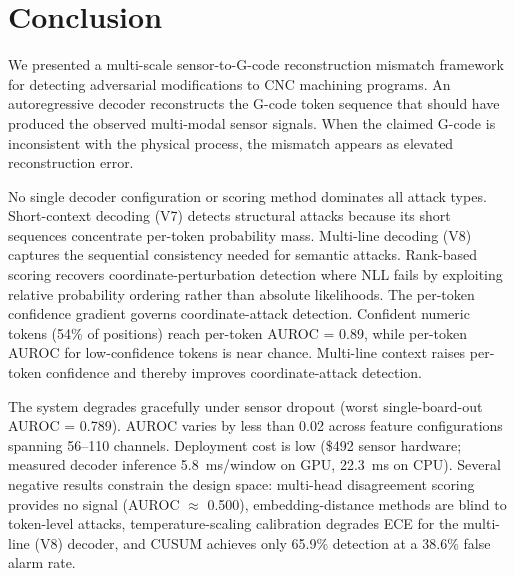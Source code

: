\section{Conclusion}
\label{sec:conclusion}

We presented a multi-scale sensor-to-G-code reconstruction mismatch framework for detecting adversarial modifications to CNC machining programs.
An autoregressive decoder reconstructs the G-code token sequence that should have produced the observed multi-modal sensor signals.
When the claimed G-code is inconsistent with the physical process, the mismatch appears as elevated reconstruction error.

No single decoder configuration or scoring method dominates all attack types.
Short-context decoding (V7) detects structural attacks because its short sequences concentrate per-token probability mass.
Multi-line decoding (V8) captures the sequential consistency needed for semantic attacks.
Rank-based scoring recovers coordinate-perturbation detection where NLL fails by exploiting relative probability ordering rather than absolute likelihoods.
The per-token confidence gradient governs coordinate-attack detection.
Confident numeric tokens (54\% of positions) reach per-token AUROC = 0.89, while per-token AUROC for low-confidence tokens is near chance.
Multi-line context raises per-token confidence and thereby improves coordinate-attack detection.

The system degrades gracefully under sensor dropout (worst single-board-out AUROC = 0.789).
AUROC varies by less than 0.02 across feature configurations spanning 56--110 channels.
Deployment cost is low (\$492 sensor hardware; measured decoder inference 5.8~ms/window on GPU, 22.3~ms on CPU).
Several negative results constrain the design space: multi-head disagreement scoring provides no signal (AUROC $\approx$ 0.500), embedding-distance methods are blind to token-level attacks, temperature-scaling calibration degrades ECE for the multi-line (V8) decoder, and CUSUM achieves only 65.9\% detection at a 38.6\% false alarm rate.

